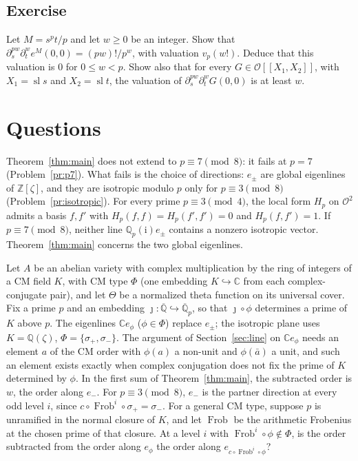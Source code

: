 \documentclass[reqno]{amsart}
\theoremstyle{definition}
\theoremstyle{plain}
\newcommand{\Z}{\mathbb{Z}}
\newcommand{\Q}{\mathbb{Q}}
\newcommand{\C}{\mathbb{C}}
\newcommand{\ii}{\mathrm{i}}
\newcommand{\Oc}{\mathcal{O}}
\newcommand{\sll}{\operatorname{sl}}
\newcommand{\Frob}{\operatorname{Frob}}
\begin{document}
\subsection*{Exercise}
Let \(M = s^p t/p\) and let \(w \ge 0\) be an integer.  Show that \(\partial_s^{pw}\partial_t^w e^{M}(0,0) = (pw)!/p^w\), with valuation \(v_p(w!)\).  Deduce that this valuation is \(0\) for \(0 \le w < p\).  Show also that for every \(G \in \Oc[[X_1, X_2]]\), with \(X_1 = \sll s\) and \(X_2 = \sll t\), the valuation of \(\partial_s^{pw}\partial_t^w G(0,0)\) is at least \(w\).

\section{Questions}\label{sec:questions}

Theorem~\ref{thm:main} does not extend to \(p \equiv 7 \pmod 8\): it fails at \(p = 7\) (Problem~\ref{pr:p7}).  What fails is the choice of directions: \(e_\pm\) are global eigenlines of \(\Z[\zeta]\), and they are isotropic modulo \(p\) only for \(p \equiv 3 \pmod 8\) (Problem~\ref{pr:isotropic}).  For every prime \(p \equiv 3 \pmod 4\), the local form \(H_p\) on \(\Oc^2\) admits a basis \(f, f'\) with \(H_p(f, f) = H_p(f', f') = 0\) and \(H_p(f, f') = 1\).  If \(p \equiv 7 \pmod 8\), neither line \(\Q_p(\ii)e_\pm\) contains a nonzero isotropic vector.  Theorem~\ref{thm:main} concerns the two global eigenlines.

Let \(A\) be an abelian variety with complex multiplication by the ring of integers of a CM field \(K\), with CM type \(\Phi\) (one embedding \(K \hookrightarrow \C\) from each complex-conjugate pair), and let \(\Theta\) be a normalized theta function on its universal cover.  Fix a prime \(p\) and an embedding \(\jmath : \overline{\Q} \hookrightarrow \overline{\Q}_p\), so that \(\jmath \circ \phi\) determines a prime of \(K\) above \(p\).  The eigenlines \(\C e_\phi\) (\(\phi \in \Phi\)) replace \(e_\pm\); the isotropic plane uses \(K = \Q(\zeta)\), \(\Phi = \{\sigma_+, \sigma_-\}\).  The argument of Section~\ref{sec:line} on \(\C e_\phi\) needs an element \(a\) of the CM order with \(\phi(a)\) a non-unit and \(\phi(\bar a)\) a unit, and such an element exists exactly when complex conjugation does not fix the prime of \(K\) determined by \(\phi\).  In the first sum of Theorem~\ref{thm:main}, the subtracted order is \(w\), the order along \(e_-\).  For \(p \equiv 3 \pmod 8\), \(e_-\) is the partner direction at every odd level \(i\), since \(c \circ \Frob^i \circ \sigma_+ = \sigma_-\).  For a general CM type, suppose \(p\) is unramified in the normal closure of \(K\), and let \(\Frob\) be the arithmetic Frobenius at the chosen prime of that closure.  At a level \(i\) with \(\Frob^i \circ \phi \notin \Phi\), is the order subtracted from the order along \(e_\phi\) the order along \(e_{c \circ \Frob^i \circ \phi}\)?
\end{document}

